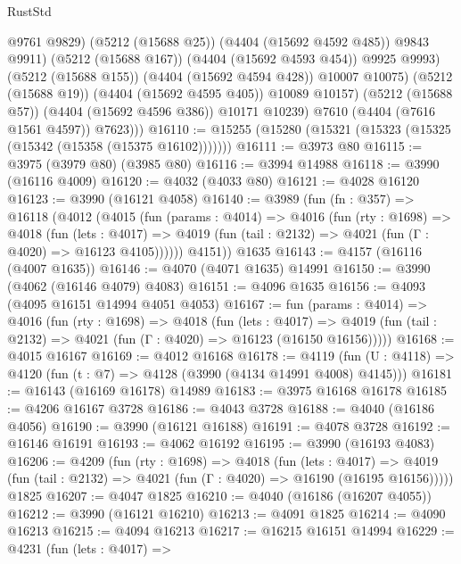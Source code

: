 \begin{lexlean}{RustStd}
\begin{coremodule}
                      @9761
                      @9829)
                    (@5212 (@15688 @25))
                    (@4404 (@15692 @4592 @485))
                    @9843
                    @9911)
                  (@5212 (@15688 @167))
                  (@4404 (@15692 @4593 @454))
                  @9925
                  @9993)
                (@5212 (@15688 @155))
                (@4404 (@15692 @4594 @428))
                @10007
                @10075)
              (@5212 (@15688 @19))
              (@4404 (@15692 @4595 @405))
              @10089
              @10157)
            (@5212 (@15688 @57))
            (@4404 (@15692 @4596 @386))
            @10171
            @10239)
          @7610
          (@4404 (@7616 @1561 @4597))
          @7623)))
@16110 := @15255 (@15280 (@15321 (@15323 (@15325 (@15342 (@15358 (@15375 @16102)))))))
@16111 := @3973 @80
@16115 := @3975 (@3979 @80) (@3985 @80)
@16116 := @3994 @14988
@16118 := @3990 (@16116 @4009)
@16120 := @4032 (@4033 @80)
@16121 := @4028 @16120
@16123 := @3990 (@16121 @4058)
@16140 := @3989
    (fun (fn : @357) =>
    @16118
      (@4012
        (@4015
          (fun (params : @4014) =>
          @4016
            (fun (rty : @1698) =>
            @4018
              (fun (lets : @4017) =>
              @4019 (fun (tail : @2132) => @4021 (fun (Γ : @4020) => @16123 @4105))))))
        @4151))
    @1635
@16143 := @4157 (@16116 (@4007 @1635))
@16146 := @4070 (@4071 @1635) @14991
@16150 := @3990 (@4062 (@16146 @4079) @4083)
@16151 := @4096 @1635
@16156 := @4093 (@4095 @16151 @14994 @4051 @4053)
@16167 := fun (params : @4014) =>
  @4016
    (fun (rty : @1698) =>
    @4018
      (fun (lets : @4017) =>
      @4019 (fun (tail : @2132) => @4021 (fun (Γ : @4020) => @16123 (@16150 @16156)))))
@16168 := @4015 @16167
@16169 := @4012 @16168
@16178 := @4119
    (fun (U : @4118) => @4120 (fun (t : @7) => @4128 (@3990 (@4134 @14991 @4008) @4145)))
@16181 := @16143 (@16169 @16178) @14989
@16183 := @3975 @16168 @16178
@16185 := @4206 @16167 @3728
@16186 := @4043 @3728
@16188 := @4040 (@16186 @4056)
@16190 := @3990 (@16121 @16188)
@16191 := @4078 @3728
@16192 := @16146 @16191
@16193 := @4062 @16192
@16195 := @3990 (@16193 @4083)
@16206 := @4209
    (fun (rty : @1698) =>
    @4018
      (fun (lets : @4017) =>
      @4019 (fun (tail : @2132) => @4021 (fun (Γ : @4020) => @16190 (@16195 @16156)))))
    @1825
@16207 := @4047 @1825
@16210 := @4040 (@16186 (@16207 @4055))
@16212 := @3990 (@16121 @16210)
@16213 := @4091 @1825
@16214 := @4090 @16213
@16215 := @4094 @16213
@16217 := @16215 @16151 @14994
@16229 := @4231
    (fun (lets : @4017) =>

\end{coremodule}
\end{lexlean}
